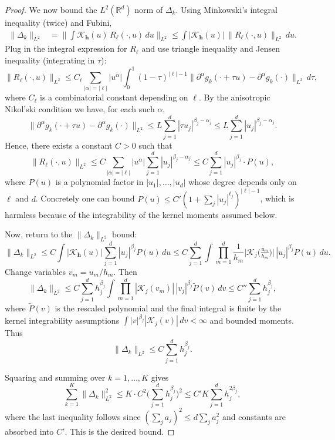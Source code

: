 \documentclass[preprint,11pt]{article}
\newcommand{\mcal}{\mathcal}
\numberwithin{equation}{section}
\begin{document}
\begin{proof}
We now bound the $L^2(\mathbb{R}^d)$ norm of $\Delta_k$. Using Minkowski's integral inequality (twice) and Fubini,
\begin{align*}
\|\Delta_k\|_{L^2} 
&= \Big\| \int \mcal{K}_{\mathbf{h}}(u)\, R_\ell(\cdot,u)\,du \Big\|_{L^2}
\le \int |\mcal{K}_{\mathbf{h}}(u)|\, \|R_\ell(\cdot,u)\|_{L^2}\,du.
\end{align*}
Plug in the integral expression for $R_\ell$ and use triangle inequality and Jensen inequality (integrating in $\tau$):
\[
\|R_\ell(\cdot,u)\|_{L^2}
\le C_\ell \sum_{|\alpha|=|\ell|} |u^\alpha| \int_0^1 (1-\tau)^{|\ell|-1}
\|\partial^\alpha g_k(\cdot+\tau u)-\partial^\alpha g_k(\cdot)\|_{L^2}\,d\tau,
\]
where \(C_\ell\) is a combinatorial constant depending on \(\ell\). By the anisotropic Nikol'ski condition we have, for each such \(\alpha\),
\[
\|\partial^\alpha g_k(\cdot+\tau u)-\partial^\alpha g_k(\cdot)\|_{L^2}
\le L \sum_{j=1}^d |\tau u_j|^{\beta_j-\alpha_j}
\le L \sum_{j=1}^d |u_j|^{\beta_j-\alpha_j}.
\]
Hence, there exists a constant $C>0$ such that
\[
\|R_\ell(\cdot,u)\|_{L^2}
\le C \sum_{|\alpha|=|\ell|} |u^\alpha|\sum_{j=1}^d |u_j|^{\beta_j-\alpha_j}
\le C \sum_{j=1}^d |u_j|^{\beta_j} \cdot P(u),
\]
where \(P(u)\) is a polynomial factor in \(|u_1|,\dots,|u_d|\) whose degree depends only on \(\ell\) and \(d\). Concretely one can bound \(P(u)\le C'(1+\sum_{j}|u_j|^{\ell_j})^{|\ell|-1}\), which is harmless because of the integrability of the kernel moments assumed below.

Now, return to the $\|\Delta_k\|_{L^2}$ bound:
\[
\|\Delta_k\|_{L^2}
\le C \int |\mcal{K}_{\mathbf{h}}(u)| \sum_{j=1}^d |u_j|^{\beta_j} P(u)\,du
\le C \sum_{j=1}^d \int \prod_{m=1}^d \frac{1}{h_m}\big|\mcal{K}_j\big(\tfrac{u_m}{h_m}\big)\big|
\, |u_j|^{\beta_j} P(u)\,du.
\]
Change variables $v_m=u_m/h_m$. Then
\[
\|\Delta_k\|_{L^2}
\le C \sum_{j=1}^d h_j^{\beta_j} \int \prod_{m=1}^d |\mcal{K}_j(v_m)|\, |v_j|^{\beta_j} \tilde P(v)\,dv
\le C''\sum_{j=1}^d h_j^{\beta_j},
\]
where $\tilde P(v)$ is the rescaled polynomial and the final integral is finite by the kernel integrability assumptions $\int |v|^{\beta_j}|\mcal{K}_j(v)|\,dv<\infty$ and bounded moments. Thus
\[
\|\Delta_k\|_{L^2} \le C\sum_{j=1}^d h_j^{\beta_j}.
\]

Squaring and summing over $k=1,\dots,K$ gives
\[
\sum_{k=1}^K \|\Delta_k\|_{L^2}^2
\le K \cdot C^2 \Big(\sum_{j=1}^d h_j^{\beta_j}\Big)^2
\le C' K \sum_{j=1}^d h_j^{2\beta_j},
\]
where the last inequality follows since $(\sum_j a_j)^2 \le d\sum_j a_j^2$ and constants are absorbed into \(C'\). This is the desired bound.
\end{proof}


\end{document}
